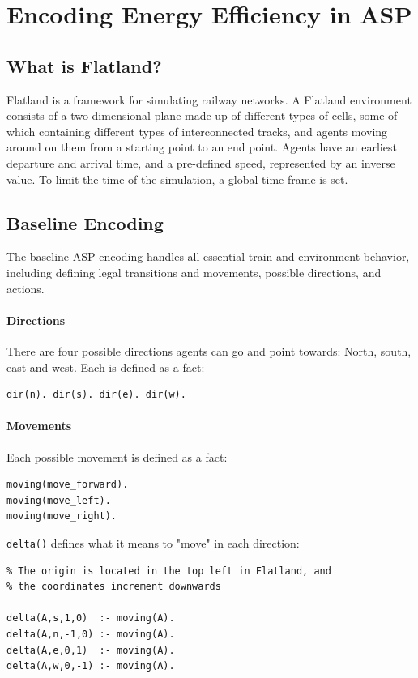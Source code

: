 \section{Encoding Energy Efficiency in ASP}
\subsection{What is Flatland?}\label{subs:what}
Flatland is a framework for simulating railway networks. A Flatland environment consists of a two dimensional plane made up of different types of cells, some of which containing different types of interconnected tracks, and agents moving around on them from a starting point to an end point. Agents have an earliest departure and arrival time, and a pre-defined speed, represented by an inverse value. To limit the time of the simulation, a global time frame is set.

\subsection{Baseline Encoding}
The baseline ASP encoding handles all essential train and environment behavior, including defining legal transitions and movements, possible directions, and actions.

\paragraph{Directions}
There are four possible directions agents can go and point towards: North, south, east and west. Each is defined as a fact:
\begin{verbatim}
dir(n). dir(s). dir(e). dir(w).
\end{verbatim}

\paragraph{Movements}
Each possible movement is defined as a fact:
\begin{verbatim}
moving(move_forward).
moving(move_left).
moving(move_right).
\end{verbatim}
\texttt{delta()} defines what it means to "move" in each direction:
\begin{verbatim}
% The origin is located in the top left in Flatland, and 
% the coordinates increment downwards

delta(A,s,1,0)  :- moving(A).
delta(A,n,-1,0) :- moving(A).
delta(A,e,0,1)  :- moving(A).
delta(A,w,0,-1) :- moving(A).
\end{verbatim}

